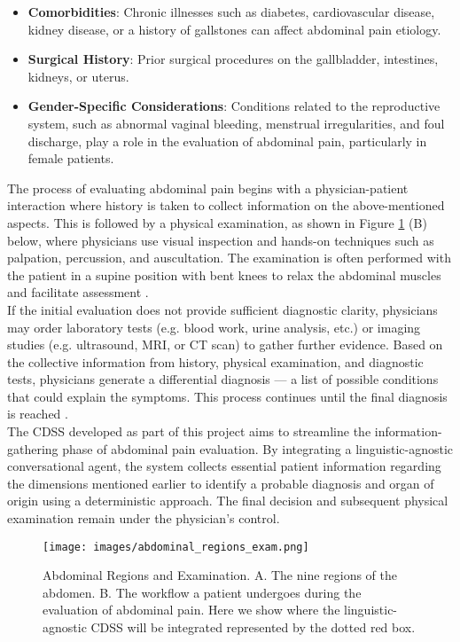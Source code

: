 \begin{itemize}
    \item \textcolor{TUMRed}{\textbf{Comorbidities}}: Chronic illnesses such as diabetes, cardiovascular disease, kidney disease, or a history of gallstones can affect abdominal pain etiology.
    \item \textcolor{TUMRed}{\textbf{Surgical History}}: Prior surgical procedures on the gallbladder, intestines, kidneys, or uterus.
    \item \textcolor{TUMRed}{\textbf{Gender-Specific Considerations}}: Conditions related to the reproductive system, such as abnormal vaginal bleeding, menstrual irregularities, and foul discharge, play a role in the evaluation of abdominal pain, particularly in female patients.
\end{itemize}
\noindent The process of evaluating abdominal pain begins with a physician-patient interaction where history is taken to collect information on the above-mentioned aspects. This is followed by a physical examination, as shown in Figure \ref{fig:abdominal_regions} (B) below, where physicians use visual inspection and hands-on techniques such as palpation, percussion, and auscultation. The examination is often performed with the patient in a supine position with bent knees to relax the abdominal muscles and facilitate assessment \cite{AbExm, cartwright2008evaluation}.\\[\baselineskip]

\noindent If the initial evaluation does not provide sufficient diagnostic clarity, physicians may order laboratory tests (e.g. blood work, urine analysis, etc.) or imaging studies (e.g. ultrasound, MRI, or CT scan) to gather further evidence. Based on the collective information from history, physical examination, and diagnostic tests, physicians generate a differential diagnosis --- a list of possible conditions that could explain the symptoms. This process continues until the final diagnosis is reached \cite{ddCleveland}.\\[\baselineskip]

\noindent The CDSS developed as part of this project aims to streamline the information-gathering phase of abdominal pain evaluation. By integrating a linguistic-agnostic conversational agent, the system collects essential patient information regarding the dimensions mentioned earlier to identify a probable diagnosis and organ of origin using a deterministic approach. The final decision and subsequent physical examination remain under the physician's control.

\begin{figure}[H]
    \centering
    \texttt{[image: images/abdominal\_regions\_exam.png]}
    \caption{Abdominal Regions and Examination. A. The nine regions of the abdomen. B. The workflow a patient undergoes during the evaluation of abdominal pain. Here we show where the linguistic-agnostic CDSS will be integrated represented by the dotted red box.} 
    \label{fig:abdominal_regions}
\end{figure}


